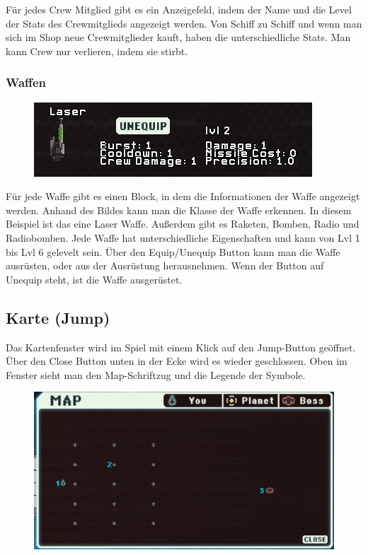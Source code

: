 \documentclass[fontsize=12pt,paper=a4,twoside]{scrartcl}
\begin{document}
Für jedes Crew Mitglied gibt es ein Anzeigefeld, indem der Name und die Level der Stats des Crewmitglieds angezeigt werden. Von Schiff zu Schiff und wenn man sich im Shop neue Crewmitglieder kauft, haben die unterschiedliche Stats. Man kann Crew nur verlieren, indem sie stirbt. 


\subsubsection{Waffen}

\begin{figure}[H]
\centering
\includegraphics[width=0.8\linewidth]{DasSpiel/Inventar/waffe.png}
\end{figure} 

Für jede Waffe gibt es einen Block, in dem die Informationen der Waffe angezeigt werden. Anhand des Bildes kann man die Klasse der Waffe erkennen. In diesem Beispiel ist das eine Laser Waffe. Außerdem gibt es Raketen, Bomben, Radio und Radiobomben. Jede Waffe hat unterschiedliche Eigenschaften und kann von Lvl 1 bis Lvl 6 gelevelt sein. Über den Equip/Unequip Button kann man die Waffe ausrüsten, oder aus der Ausrüstung herausnehmen. Wenn der Button auf Unequip steht, ist die Waffe ausgerüstet. 




\subsection{Karte (Jump)}

Das Kartenfenster wird im Spiel mit einem Klick auf den Jump-Button geöffnet. Über den Close Button unten in der Ecke wird es wieder geschlossen. Oben im Fenster sieht man den Map-Schriftzug und die Legende der Symbole.

\begin{figure}[H]
\centering
\includegraphics[width=0.8\linewidth]{dasspiel/karte/karteuebersicht.png}
\end{figure} 
\end{document}
